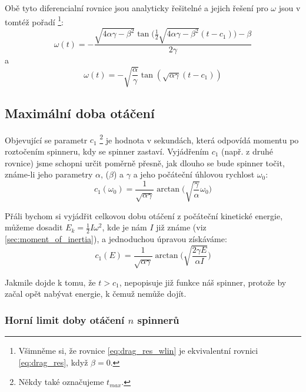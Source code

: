 \documentclass[12pt, a4paper,
 twoside,        %
 openright
]{report}
\begin{document}
Obě tyto diferencialní rovnice jsou analyticky řešitelné a jejich řešení pro $\omega$ jsou v tomtéž pořadí \footnote{Všimněme si, že rovnice \ref{eq:drag_res_wlin} je ekvivalentní rovnici \ref{eq:drag_res}, když $\beta = 0$.}:
\begin{equation}
    \label{eq:drag_res_wlin}
    \omega(t) = -\frac{\sqrt{4\alpha\gamma - \beta^2} \tan{(\frac{1}{2}\sqrt{4\alpha\gamma - \beta^2}(t-c_1)})-\beta}{2\gamma} 
\end{equation}
a
\begin{equation}
    \label{eq:drag_res}
    \omega(t) = -\sqrt{\frac{\alpha}{\gamma}} \tan{(\sqrt{\alpha\gamma}(t-c_1))}
\end{equation}

\subsection{Maximální doba otáčení}

Objevující se parametr $c_1$ \footnote{Někdy také označujeme $t_{max}$.} je hodnota v sekundách, která odpovídá momentu po roztočením spinneru, kdy se spinner zastaví. Vyjádřením $c_1$ (např. z druhé rovnice) jsme schopni určit poměrně přesně, jak dlouho se bude spinner točit, známe-li jeho parametry $\alpha$, ($\beta$) a $\gamma$ a jeho počáteční úhlovou rychlost $\omega_0$:
\begin{equation}
    \label{eq:runtime_from_omeg0}
    c_1(\omega_0) = \frac{1}{\sqrt{\alpha\gamma}} \arctan{ \bigg( \sqrt{\frac{\gamma}{\alpha}} \omega_0 \bigg)}
\end{equation}

Přáli bychom si vyjádřit celkovou dobu otáčení z počáteční kinetické energie, můžeme dosadit $E_k = \frac{1}{2}I\omega^2$, kde je nám $I$ již známe (viz \ref{sec:moment_of_inertia}), a jednoduchou úpravou získáváme:
\begin{equation}
    \label{eq:runtime_from_ene}
    c_1(E) = \frac{1}{\sqrt{\alpha\gamma}} \arctan{ \bigg( \sqrt{\frac{2 \gamma E}{\alpha I}} \bigg)}
\end{equation}

Jakmile dojde k tomu, že $t > c_1$, nepopisuje již funkce náš spinner, protože by začal opět nabývat energie, k čemuž nemůže dojít.

\clearpage

\subsubsection{Horní limit doby otáčení $n$ spinnerů}
\end{document}

